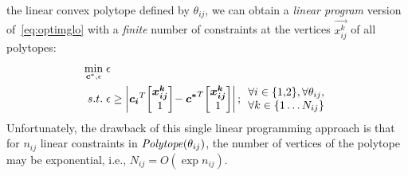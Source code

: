 the linear convex polytope defined by $\theta_{ij}$, we can obtain a
\emph{linear program} version of~\eqref{eq:optimglo} with a \emph{finite} 
number of constraints at the vertices $\vec{x_{ij}^k}$ of all polytopes:
\begin{align}
\min_{\boldsymbol{c}^*,\epsilon} \; & \epsilon \label{eq:linear_exp} \\
s.t. \;       & \epsilon \geq \left| \boldsymbol{c_i}^T \! \begin{bmatrix} \boldsymbol{x_{ij}^k}\\1 \end{bmatrix} \! - \boldsymbol{c^*}^T \! \begin{bmatrix} \boldsymbol{x_{ij}^k}\\1 \end{bmatrix} \right|; 
\begin{array}{l}
\forall i \in \{ 1,\!2 \}, \forall \theta_{ij} \nonumber,\\ 
\forall k \in \{ 1 \ldots N_{ij} \}
\end{array}
\end{align}
Unfortunately, the drawback of this single linear programming approach
is that for $n_{ij}$ linear constraints in $\mathit{Polytope}(\theta_{ij})$, the
number of vertices of the polytope may be exponential, i.e., $N_{ij} =
O(\exp n_{ij})$.  


